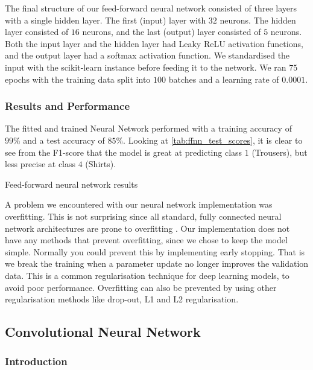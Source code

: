 \documentclass[../main.tex]{subfiles}
\begin{document}
The final structure of our feed-forward neural network consisted 
of three layers with a single hidden layer. The first (input) 
layer with $32$ neurons. The hidden layer consisted of $16$ 
neurons, and the last (output) layer consisted of $5$ neurons. 
Both the input layer and the hidden layer had Leaky ReLU 
activation functions, and the output layer had a softmax 
activation function.
We standardised the input with the scikit-learn 
 instance before feeding it to the 
network. We ran $75$ epochs with the training data split into 
$100$ batches and a learning rate of $0.0001$.


\subsubsection{Results and Performance}

The fitted and trained Neural Network performed with a training 
accuracy of $99\%$ and a test accuracy of $85\%$.
Looking at \autoref{tab:ffnn_test_scores}, it is clear to see 
from the F1-score that the model is great at predicting class $1$ 
(Trousers), but less precise at class $4$ (Shirts). 

\begin{table}[H]
    \centering
    
    \caption{Feed-forward neural network results}
    \label{tab:ffnn_test_scores}
\end{table}
 
A problem we encountered with our neural network implementation 
was overfitting. This is not surprising since all standard, fully 
connected neural network architectures are prone to overfitting 
\autocite{prechelt_early_2012}. Our implementation does not have 
any methods that prevent overfitting, since we chose to keep the 
model simple. Normally you could prevent this by implementing 
early stopping. That is we break the training when a parameter 
update no longer improves the validation data. This is a common 
regularisation technique for deep learning models, to avoid poor 
performance. Overfitting can also be prevented by using other 
regularisation methods like drop-out, L1 and L2 regularisation. 


\subsection{Convolutional Neural Network}

\subsubsection{Introduction}
\end{document}
